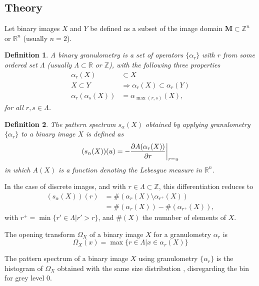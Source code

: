 \documentclass{sciposter}
\newtheorem{Def}{Definition}
\begin{document}
\begin{multicols}{3}
\section{Theory}

Let binary images $X$ and $Y$ be defined as a subset of the image domain 
${\mathbf M}\subset {\mathbb Z}^n$ or ${\mathbb R}^n$ (usually $n=2$). 
\begin{Def}
A binary 
granulometry is a set of operators $\{\alpha_r\}$ with $r$ from some ordered 
set $\Lambda$ (usually $\Lambda \subset {\mathbb R}$ or ${\mathbb Z}$), with 
the following three properties
\begin{align}
   \alpha_r(X) & \subset  X \label{eq:antiext} \\
   X \subset Y & \Rightarrow \alpha_r(X) \subset \alpha_r(Y) 
   \label{eq:increasing} \\
   \alpha_r(\alpha_s(X)) & =  \alpha_{\max(r,s)}(X) \label{eq:idempot},
\end{align}   
for all $r,s \in \Lambda$.
\end{Def}

\begin{Def}
The pattern spectrum $s_{\alpha}(X)$ obtained by applying 
granulometry $\{\alpha_r\}$ to a binary image $X$ is defined as
\begin{equation}
    (s_{\alpha}(X))(u) = 
    - \frac{\partial A(\alpha_r(X))}{\partial r}\bigg{\vert}_{r=u}
\end{equation}
in which $A(X)$ is a function denoting the Lebesgue measure in 
${\mathbb R}^n$.
\end{Def} 
In the case of discrete images, and with $r \in \Lambda \subset {\mathbb Z}$, 
this differentiation reduces to
\begin{align}
    (s_{\alpha}(X))(r)  & = \#(\alpha_{r}(X) \setminus \alpha_{r^+}(X)) \\ 
                        & = \#(\alpha_{r}(X)) - \#(\alpha_{r^+}(X)), 
\end{align}
with $r^+ = \min\{ r' \in \Lambda \vert r' > r \}$, and $\#(X)$ the 
numnber of elements of $X$.

The opening transform \cite{Nacken:thesis} $\Omega_X$ of a binary image $X$ 
for a granulometry ${\alpha_r}$ is
\begin{equation}
  \Omega_X(x) = \max\{ r \in \Lambda \vert x \in \alpha_r(X) \}
\end{equation}

The pattern spectrum of a binary image $X$ using granulometry 
$\{\alpha_r\}$ is the histogram of $\Omega_X$ obtained with the same 
size distribution \cite{Nacken:thesis}, disregarding the bin for grey level 0.



\end{multicols}
\end{document}
